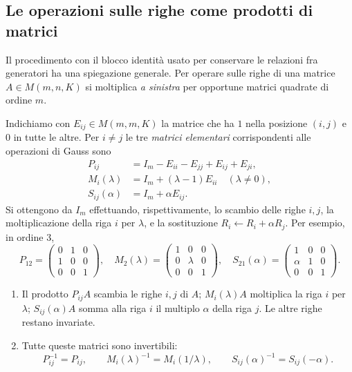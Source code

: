 \subsection{Le operazioni sulle righe come prodotti di matrici}
Il procedimento con il blocco identità usato per conservare le relazioni fra generatori ha una spiegazione generale. Per operare sulle righe di una matrice $A\in M(m,n,K)$ si moltiplica \emph{a sinistra} per opportune matrici quadrate di ordine $m$.

Indichiamo con $E_{ij}\in M(m,m,K)$ la matrice che ha $1$ nella posizione $(i,j)$ e $0$ in tutte le altre. Per $i\ne j$ le tre \emph{matrici elementari} corrispondenti alle operazioni di Gauss sono
\begin{align*}
 P_{ij}&=I_m-E_{ii}-E_{jj}+E_{ij}+E_{ji},\\
 M_i(\lambda)&=I_m+(\lambda-1)E_{ii}\quad(\lambda\ne0),\\
 S_{ij}(\alpha)&=I_m+\alpha E_{ij}.
\end{align*}
Si ottengono da $I_m$ effettuando, rispettivamente, lo scambio delle righe $i,j$, la moltiplicazione della riga $i$ per $\lambda$, e la sostituzione $R_i\leftarrow R_i+\alpha R_j$. Per esempio, in ordine $3$,
\[
 P_{12}=\begin{pmatrix}0&1&0\\1&0&0\\0&0&1\end{pmatrix},\quad
 M_2(\lambda)=\begin{pmatrix}1&0&0\\0&\lambda&0\\0&0&1\end{pmatrix},\quad
 S_{21}(\alpha)=\begin{pmatrix}1&0&0\\\alpha&1&0\\0&0&1\end{pmatrix}.
\]
\begin{proposizione}
\begin{enumerate}[label=\arabic*.]
\item Il prodotto $P_{ij}A$ scambia le righe $i,j$ di $A$; $M_i(\lambda)A$ moltiplica la riga $i$ per $\lambda$; $S_{ij}(\alpha)A$ somma alla riga $i$ il multiplo $\alpha$ della riga $j$. Le altre righe restano invariate.
\item Tutte queste matrici sono invertibili:
\[
 P_{ij}^{-1}=P_{ij},\qquad M_i(\lambda)^{-1}=M_i(1/\lambda),\qquad
 S_{ij}(\alpha)^{-1}=S_{ij}(-\alpha).
\]
\end{enumerate}
\end{proposizione}

